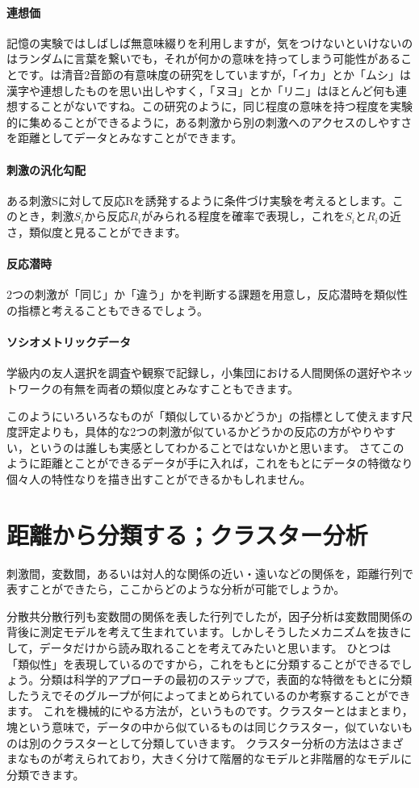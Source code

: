 \documentclass{ltjsbook}
\begin{document}
\paragraph{連想価}記憶の実験ではしばしば無意味綴りを利用しますが，気をつけないといけないのはランダムに言葉を繋いでも，それが何かの意味を持ってしまう可能性があることです。\citet{Umemoto1955}は清音2音節の有意味度の研究をしていますが，「イカ」とか「ムシ」は漢字や連想したものを思い出しやすく，「ヌヨ」とか「リニ」はほとんど何も連想することがないですね。この研究のように，同じ程度の意味を持つ程度を実験的に集めることができるように，ある刺激から別の刺激へのアクセスのしやすさを距離としてデータとみなすことができます。
\paragraph{刺激の汎化勾配}ある刺激Sに対して反応Rを誘発するように条件づけ実験を考えるとします。このとき，刺激$S_i$から反応$R_i$がみられる程度を確率で表現し，これを$S_i$と$R_i$の近さ，類似度と見ることができます。
\paragraph{反応潜時}2つの刺激が「同じ」か「違う」かを判断する課題を用意し，反応潜時を類似性の指標と考えることもできるでしょう。
\paragraph{ソシオメトリックデータ}学級内の友人選択を調査や観察で記録し，小集団における人間関係の選好やネットワークの有無を両者の類似度とみなすこともできます。

このようにいろいろなものが「類似しているかどうか」の指標として使えます尺度評定よりも，具体的な2つの刺激が似ているかどうかの反応の方がやりやすい，というのは誰しも実感としてわかることではないかと思います。
さてこのように距離とことができるデータが手に入れば，これをもとにデータの特徴なり個々人の特性なりを描き出すことができるかもしれません。

\section{距離から分類する；クラスター分析}
刺激間，変数間，あるいは対人的な関係の近い・遠いなどの関係を，距離行列で表すことができたら，ここからどのような分析が可能でしょうか。

分散共分散行列も変数間の関係を表した行列でしたが，因子分析は変数間関係の背後に測定モデルを考えて生まれています。しかしそうしたメカニズムを抜きにして，データだけから読み取れることを考えてみたいと思います。
ひとつは「類似性」を表現しているのですから，これをもとに分類することができるでしょう。分類は科学的アプローチの最初のステップで，表面的な特徴をもとに分類したうえでそのグループが何によってまとめられているのか考察することができます。
これを機械的にやる方法が，というものです。クラスターとはまとまり，塊という意味で，データの中から似ているものは同じクラスター，似ていないものは別のクラスターとして分類していきます。
クラスター分析の方法はさまざまなものが考えられており，大きく分けて階層的なモデルと非階層的なモデルに分類できます。
\end{document}
